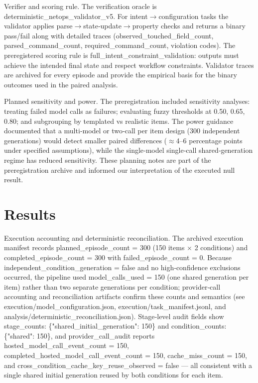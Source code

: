 \documentclass[conference]{IEEEtran}
\begin{document}
Verifier and scoring rule. The verification oracle is deterministic\_netops\_validator\_v5. For intent\ensuremath{\rightarrow}configuration tasks the validator applies parse\ensuremath{\rightarrow}state‑update\ensuremath{\rightarrow}property checks and returns a binary pass/fail along with detailed traces (observed\_touched\_field\_count, parsed\_command\_count, required\_command\_count, violation codes). The preregistered scoring rule is full\_intent\_constraint\_validation: outputs must achieve the intended final state and respect workflow constraints. Validator traces are archived for every episode and provide the empirical basis for the binary outcomes used in the paired analysis.

Planned sensitivity and power. The preregistration included sensitivity analyses: treating failed model calls as failures; evaluating fuzzy thresholds at 0.50, 0.65, 0.80; and subgrouping by templated vs realistic items. The power guidance documented that a multi‑model or two‑call per item design (300 independent generations) would detect smaller paired differences (\ensuremath{\approx}4--6 percentage points under specified assumptions), while the single‑model single‑call shared‑generation regime has reduced sensitivity. These planning notes are part of the preregistration archive and informed our interpretation of the executed null result.

\section{Results}
Execution accounting and deterministic reconciliation. The archived execution manifest records planned\_episode\_count = 300 (150 items \ensuremath{\times} 2 conditions) and completed\_episode\_count = 300 with failed\_episode\_count = 0. Because independent\_condition\_generation = false and no high‑confidence exclusions occurred, the pipeline used model\_calls\_used = 150 (one shared generation per item) rather than two separate generations per condition; provider‑call accounting and reconciliation artifacts confirm these counts and semantics (see execution/model\_configuration.json, execution/task\_manifest.jsonl, and analysis/deterministic\_reconciliation.json). Stage‑level audit fields show stage\_counts: \{"shared\_initial\_generation": 150\} and condition\_counts: \{"shared": 150\}, and provider\_call\_audit reports hosted\_model\_call\_event\_count = 150, completed\_hosted\_model\_call\_event\_count = 150, cache\_miss\_count = 150, and cross\_condition\_cache\_key\_reuse\_observed = false --- all consistent with a single shared initial generation reused by both conditions for each item.
\end{document}
